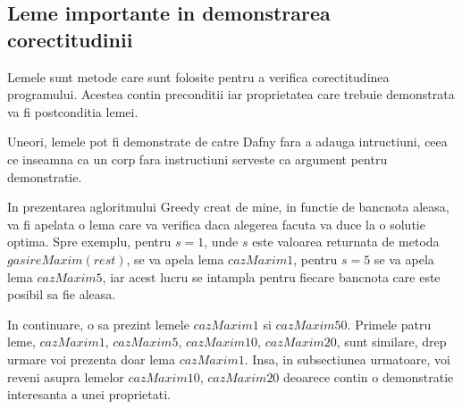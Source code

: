 \subsection{Leme importante in demonstrarea corectitudinii}
Lemele sunt metode care sunt folosite pentru a verifica corectitudinea programului. Acestea contin preconditii iar proprietatea care trebuie demonstrata va fi postconditia lemei.\par
Uneori, lemele pot fi demonstrate de catre Dafny fara a adauga intructiuni, ceea ce inseamna ca un corp fara instructiuni serveste ca argument pentru demonstratie.
\par
In prezentarea agloritmului Greedy creat de mine, in functie de bancnota aleasa, va fi apelata o lema care va verifica daca alegerea facuta va duce la o solutie optima. Spre exemplu, pentru $s = 1$, unde $s$ este valoarea returnata de metoda $gasireMaxim(rest)$, se va apela lema $cazMaxim1$, pentru $s = 5$ se va apela lema $cazMaxim5$, iar acest lucru se intampla pentru fiecare bancnota care este posibil sa fie aleasa. \par 
In continuare, o sa prezint lemele $cazMaxim1$ si $cazMaxim50$. Primele patru leme, $cazMaxim1$, $cazMaxim5$, $cazMaxim10$, $cazMaxim20$, sunt similare, drep urmare voi prezenta doar lema $cazMaxim1$. Insa, in subsectiunea urmatoare, voi reveni asupra lemelor $cazMaxim10$, $cazMaxim20$ deoarece contin o demonstratie interesanta a unei proprietati.
\vspace{2.5cm}

